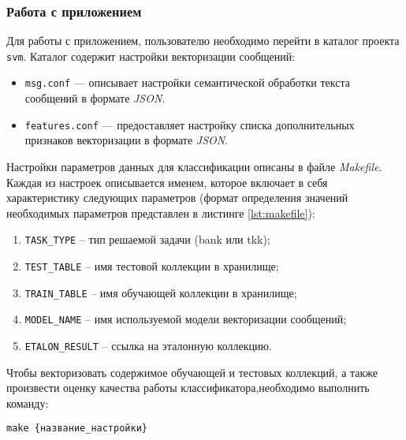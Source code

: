     \subsubsection{Работа с приложением}

        Для работы с приложением, пользователю необходимо перейти в каталог проекта {\tt svm}.
        Каталог содержит настройки векторизации сообщений:
        \begin{itemize}
            \item {\tt msg.conf} --- описывает настройки семантической обработки текста
                сообщений в формате {\it JSON}.
            \item {\tt features.conf} --- предоставляет настройку списка
                дополнительных признаков векторизации в формате {\it JSON}.
        \end{itemize}

        Настройки параметров данных для классификации описаны в файле {\it Makefile}.
        Каждая из настроек описывается именем, которое включает в себя
        характеристику следующих параметров (формат определения значений необходимых
        параметров представлен в листинге \ref{lst:makefile}):

        \begin{enumerate}
            \item {\tt TASK\_TYPE} -- тип решаемой задачи ({bank} или {tkk});
            \item {\tt TEST\_TABLE} -- имя тестовой коллекции в хранилище;
            \item {\tt TRAIN\_TABLE} -- имя обучающей коллекции в хранилище;
            \item {\tt MODEL\_NAME} -- имя используемой модели векторизации сообщений;
            \item {\tt ETALON\_RESULT} -- ссылка на эталонную коллекцию.
        \end{enumerate}

        \lstset{style=bash}
        

        Чтобы векторизовать содержимое обучающей и тестовых коллекций, а также
        произвести оценку качества работы классификатора,необходимо выполнить
        команду:
        \begin{center}
            {\tt make {\{название\_настройки\}}}
        \end{center}

